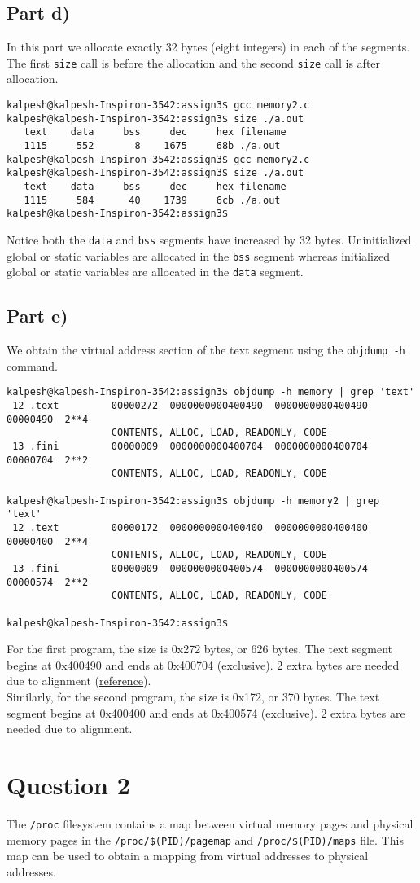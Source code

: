 \documentclass[a4paper,12pt]{article}
\begin{document}
\subsection{Part d)}
In this part we allocate exactly 32 bytes (eight integers) in each of the segments. The first \texttt{size} call is before the allocation and the second \texttt{size} call is after allocation.
\begin{lstlisting}
kalpesh@kalpesh-Inspiron-3542:assign3$ gcc memory2.c 
kalpesh@kalpesh-Inspiron-3542:assign3$ size ./a.out 
   text	   data	    bss	    dec	    hex	filename
   1115	    552	      8	   1675	    68b	./a.out
kalpesh@kalpesh-Inspiron-3542:assign3$ gcc memory2.c 
kalpesh@kalpesh-Inspiron-3542:assign3$ size ./a.out 
   text	   data	    bss	    dec	    hex	filename
   1115	    584	     40	   1739	    6cb	./a.out
kalpesh@kalpesh-Inspiron-3542:assign3$ 
\end{lstlisting}
Notice both the \texttt{data} and \texttt{bss} segments have increased by 32 bytes. Uninitialized global or static variables are allocated in the \texttt{bss} segment whereas initialized global or static variables are allocated in the \texttt{data} segment.
\subsection{Part e)}
We obtain the virtual address section of the text segment using the \texttt{objdump -h} command.
\begin{lstlisting}
kalpesh@kalpesh-Inspiron-3542:assign3$ objdump -h memory | grep 'text'
 12 .text         00000272  0000000000400490  0000000000400490  00000490  2**4
                  CONTENTS, ALLOC, LOAD, READONLY, CODE
 13 .fini         00000009  0000000000400704  0000000000400704  00000704  2**2
                  CONTENTS, ALLOC, LOAD, READONLY, CODE
                  
kalpesh@kalpesh-Inspiron-3542:assign3$ objdump -h memory2 | grep 'text'
 12 .text         00000172  0000000000400400  0000000000400400  00000400  2**4
                  CONTENTS, ALLOC, LOAD, READONLY, CODE
 13 .fini         00000009  0000000000400574  0000000000400574  00000574  2**2
                  CONTENTS, ALLOC, LOAD, READONLY, CODE

kalpesh@kalpesh-Inspiron-3542:assign3$
\end{lstlisting}
For the first program, the size is 0x272 bytes, or 626 bytes. The text segment begins at 0x400490 and ends at 0x400704 (exclusive). 2 extra bytes are needed due to alignment (\href{https://stackoverflow.com/questions/47186199/empty-space-between-text-and-fini-data-segments}{reference}).\\
Similarly, for the second program, the size is 0x172, or 370 bytes. The text segment begins at 0x400400 and ends at 0x400574 (exclusive). 2 extra bytes are needed due to alignment.
\pagebreak
\section{Question 2}
The \texttt{/proc} filesystem contains a map between virtual memory pages and physical memory pages in the \texttt{/proc/\$(PID)/pagemap} and \texttt{/proc/\$(PID)/maps} file. This map can be used to obtain a mapping from virtual addresses to physical addresses.
\end{document}
